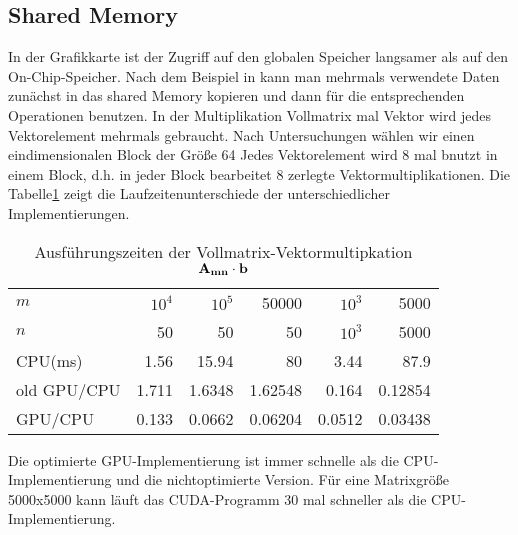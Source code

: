 \subsection{Shared Memory}
In der Grafikkarte ist der Zugriff auf den globalen Speicher langsamer als auf den On-Chip-Speicher.  Nach dem Beispiel in \cite{cudapg}  kann man mehrmals verwendete Daten zunächst in das shared Memory kopieren und dann für die entsprechenden Operationen benutzen.
In der Multiplikation Vollmatrix mal Vektor wird jedes Vektorelement mehrmals gebraucht.
Nach Untersuchungen wählen wir einen eindimensionalen Block der Größe 64
Jedes Vektorelement wird 8 mal bnutzt in einem Block, d.h. in jeder Block bearbeitet
8 zerlegte Vektormultiplikationen. Die Tabelle\ref{tab_shared_memory}
zeigt die Laufzeitenunterschiede der unterschiedlicher Implementierungen.


\begin{table}
\renewcommand{\arraystretch}{1.3}
\caption{Ausführungszeiten der Vollmatrix-Vektormultipkation $ \bf{A_{mn} } \cdot \bf b$}
\label{tab_shared_memory}
\centering
\begin{tabular}{|l||r|r|r|r|r|}

\hline
	$m$& $10^4$ & $10^5$ & 50000& $10^3 $ & 5000\\
    $n$& 50& 50& 50& $10^3$ & 5000 \\

\hline
\hline
CPU(ms)& 1.56&    15.94& 				80&      3.44& 87.9\\

old GPU/CPU& 1.711& 1.6348&   1.62548&  0.164&  0.12854\\

GPU/CPU & 0.133& 0.0662&     0.06204&   0.0512& 0.03438\\


\hline
\end{tabular}
\end{table}
Die optimierte GPU-Implementierung ist immer schnelle als die CPU-Implementierung  und die nichtoptimierte Version. Für eine Matrixgröße 5000x5000 kann läuft das CUDA-Programm 30 mal schneller als die CPU-Implementierung.

